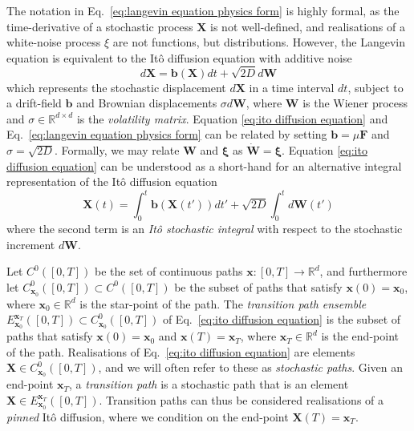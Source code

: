 The notation in Eq.~\ref{eq:langevin equation physics form} is highly formal, as the time-derivative of a stochastic process $\mathbf{X}$ is not well-defined, and realisations of a white-noise process $\xi$ are not functions, but distributions. However, the Langevin equation is equivalent to the It\^{o} diffusion equation with additive noise
\begin{equation} \label{eq:ito diffusion equation}
d \mathbf{X} = \mathbf{b}(\mathbf{X}) dt + \sqrt{2D} d \mathbf{W}
\end{equation}
which represents the stochastic displacement $d\mathbf{X}$ in a time
interval $dt$, subject to a drift-field $\mathbf{b}$ and Brownian displacements $\sigma d\mathbf{W}$, where $\mathbf{W}$ is the Wiener process and $\sigma \in \mathbb{R}^{d \times d}$ is the \textit{volatility matrix}. Equation \ref{eq:ito diffusion equation} and Eq.~\ref{eq:langevin equation physics form} can be related by setting $\mathbf{b} = \mu \mathbf{F}$ and $\sigma = \sqrt{2 D}$. Formally, we may relate $\mathbf{W}$ and $\boldsymbol{\xi}$ as $\dot{\mathbf{W}} = \boldsymbol{\xi}$. Equation \ref{eq:ito diffusion equation} can be understood as a short-hand for an alternative integral representation of the It\^{o} diffusion equation  
\begin{equation} \label{eq:integral ito equation}
\mathbf{X}(t) = \int_0^t \mathbf{b}(\mathbf{X}(t')) dt' + \sqrt{2D} \int_0^{t} d \mathbf{W}(t')
\end{equation}
where the second term is an \textit{It\^{o} stochastic integral} \citep{oksendalStochasticDifferentialEquations2003, shreveStochasticCalculusFinance2005} with respect to the stochastic increment $d \mathbf{W}$.

Let $C^0([0,T])$ be the set of continuous paths $\mathbf{x} : [0, T] \to \mathbb{R}^d$, and furthermore let $C_{\mathbf{x}_0}^0([0,T]) \subset C^0([0,T])$ be the subset of paths that satisfy $\mathbf{x}(0) = \mathbf{x}_0$, where $\mathbf{x}_0 \in \mathbb{R}^d$ is the star-point of the path. The \textit{transition path ensemble} $E_{\mathbf{x}_0}^{\mathbf{x}_T}([0,T]) \subset C_{\mathbf{x}_0}^0([0,T])$ of Eq.~\ref{eq:ito diffusion equation} is the subset of paths that satisfy $\mathbf{x}(0) = \mathbf{x}_0$ and $\mathbf{x}(T) = \mathbf{x}_T$, where $\mathbf{x}_T \in \mathbb{R}^d$ is the end-point of the path. Realisations of Eq.~\ref{eq:ito diffusion equation} are elements $\mathbf{X} \in C_{\mathbf{x}_0}^0([0,T])$, and we will often refer to these as \textit{stochastic paths}. Given an end-point $\mathbf{x}_T$, a \textit{transition path} is a stochastic path that is an element $\mathbf{X} \in E_{\mathbf{x}_0}^{\mathbf{x}_T}([0,T])$. Transition paths can thus be considered realisations of a \textit{pinned} It\^{o} diffusion, where we condition on the end-point $\mathbf{X}(T) = \mathbf{x}_T$.


